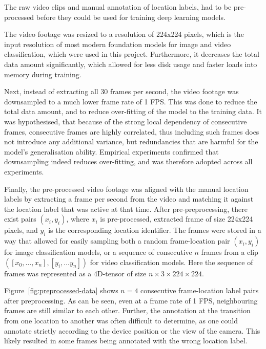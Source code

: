 \documentclass[a4paper]{article}
\begin{document}
  The raw video clips and manual annotation of location labels, had to be
  pre-processed before they could be used for training deep learning models.

  The video footage was resized to a resolution of 224x224 pixels, which is the
  input resolution of most modern foundation models for image and video
  classification, which were used in this project. Furthermore, it decreases the 
  total data amount significantly, which allowed for less disk usage and faster
  loads into memory during training.

  Next, instead of extracting all 30 frames per second, the video footage was
  downsampled to a much lower frame rate of 1 FPS. This was done to reduce the
  total data amount, and to reduce over-fitting of the model to the training
  data. It was hypothesised, that because of the strong local dependency of
  consecutive frames, consecutive frames are highly correlated, thus including
  such frames does not introduce any additional variance, but redundancies that
  are harmful for the model's generalisation ability. Empirical experiments
  confirmed that downsampling indeed reduces over-fitting, and was therefore
  adopted across all experiments.

  Finally, the pre-processed video footage was aligned with the manual location
  labels by extracting a frame per second from the video and matching it against
  the location label that was active at that time. After pre-preprocessing,
  there exist pairs $(x_i, y_i)$, where $x_i$ is pre-processed, extracted frame
  of size 224x224 pixels, and $y_i$ is the corresponding location identifier.
  The frames were stored in a way that allowed for easily sampling both a random
  frame-location pair $(x_i, y_i)$ for image classification models, or a
  sequence of consecutive $n$ frames from a clip $([x_0, \ldots, x_n], [y_i,
  \ldots y_n])$ for video classification models. Here the sequence of frames was
  represented as a 4D-tensor of size $n \times 3 \times 224 \times 224$.

  Figure~\ref{fig:preprocessed-data} shows $n=4$ consecutive frame-location
  label pairs after preprocessing. As can be seen, even at a frame rate of 1
  FPS, neighbouring frames are still similar to each other. Further, the
  annotation at the transition from one location to another was often difficult
  to determine, as one could annotate strictly according to the device position
  or the view of the camera. This likely resulted in some frames being annotated
  with the wrong location label.
\end{document}
